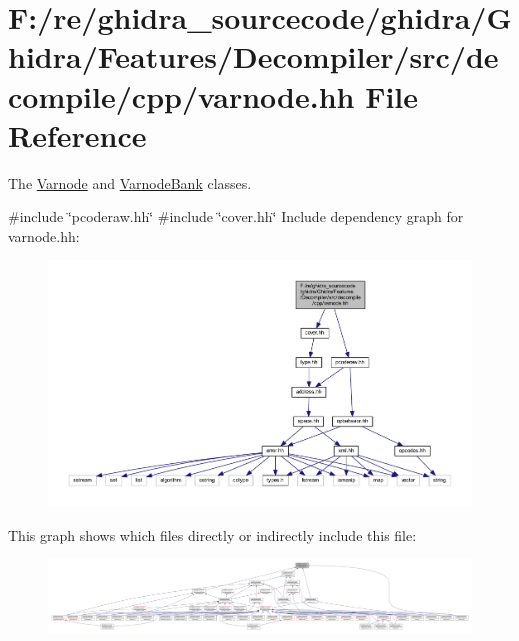 \hypertarget{varnode_8hh}{}\section{F\+:/re/ghidra\+\_\+sourcecode/ghidra/\+Ghidra/\+Features/\+Decompiler/src/decompile/cpp/varnode.hh File Reference}
\label{varnode_8hh}


The \mbox{\hyperlink{class_varnode}{Varnode}} and \mbox{\hyperlink{class_varnode_bank}{Varnode\+Bank}} classes.  


{\ttfamily \#include \char`\"{}pcoderaw.\+hh\char`\"{}}\newline
{\ttfamily \#include \char`\"{}cover.\+hh\char`\"{}}\newline
Include dependency graph for varnode.\+hh\+:
\nopagebreak
\begin{figure}[H]
\begin{center}
\leavevmode
\includegraphics[width=350pt]{varnode_8hh__incl}
\end{center}
\end{figure}
This graph shows which files directly or indirectly include this file\+:
\nopagebreak
\begin{figure}[H]
\begin{center}
\leavevmode
\includegraphics[width=350pt]{varnode_8hh__dep__incl}
\end{center}
\end{figure}
